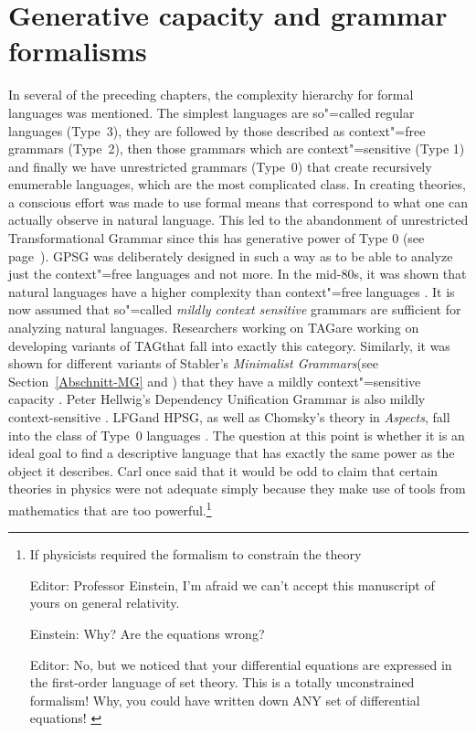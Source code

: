
\chapter{Generative capacity and grammar formalisms}
\label{Abschnitt-Generative-Kapazitaet}

In several of the preceding chapters,
the complexity hierarchy for formal languages was mentioned. The simplest languages are so"=called regular languages (Type~3),
they are followed by those described as context"=free grammars (Type~2), then those grammars which are 
context"=sensitive (Type 1) and finally we have unrestricted grammars (Type~0) that
create recursively enumerable languages, which are the most complicated class. In creating theories, a conscious effort was made to
use formal means that correspond to what one can actually observe in natural language.
This led to the abandonment of unrestricted Transformational Grammar since this has generative power of Type 0 (see page~\pageref{page-TG-Typ0}).
GPSG was deliberately designed in such a way as to be able to analyze just the context"=free
languages and not more. In the mid-80s, it was shown that natural languages have a higher complexity
than context"=free languages \citep{Shieber85a,Culy85a}. It is now assumed that so"=called
\emph{mildly context sensitive} grammars are sufficient for analyzing natural languages. Researchers
working on TAG\indextag are working on developing variants of TAG\indextag that fall into exactly
this category. Similarly, it was shown for different variants of Stabler's \emph{Minimalist
  Grammars}\indexmg (see Section~\ref{Abschnitt-MG} and \citealp{Stabler2001a,Stabler2010b}) that they
have a mildly context"=sensitive capacity \citep{Michaelis2001a-u}. Peter Hellwig's Dependency
Unification Grammar is also mildly context-sensitive
\citep[]{Hellwig2003a}. 
LFG\indexlfg and HPSG\indexhpsg, as well as Chomsky's theory in \emph{Aspects}, fall into the class of Type~0 languages \citep{Berwick82a-u,Johnson88}.
The question at this point is whether it is an ideal goal to find a descriptive language that has exactly the same power as the object it describes.
Carl \citet{Pollard96a} once said that it would be odd to claim that certain theories in physics were not adequate simply because they make use of tools
from mathematics that are too powerful.\footnote{%
If physicists required the formalism to constrain the theory

    Editor: Professor Einstein, I'm afraid we can't accept this
    manuscript of yours on general relativity.

    Einstein: Why? Are the equations wrong?

    Editor: No, but we noticed that your differential equations are
    expressed in the first-order language of set theory. This is
    a totally unconstrained formalism! Why, you could have written
    down ANY set of differential equations! \citep{Pollard96a}
}
